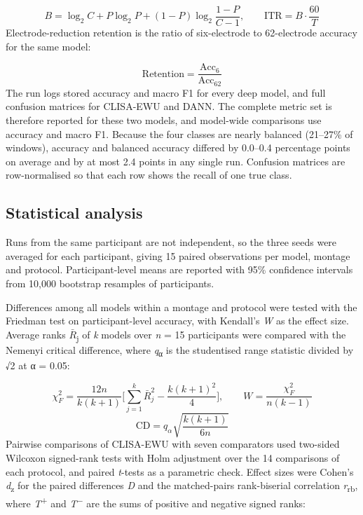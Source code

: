 \begin{equation}
  B=\log_2 C+P\log_2 P+(1-P)\log_2\frac{1-P}{C-1},\qquad \mathrm{ITR}=B\cdot\frac{60}{T}
  \label{eq:itr}
\end{equation}
Electrode-reduction retention is the ratio of six-electrode to 62-electrode accuracy for the same model:

\begin{equation}
  \mathrm{Retention}=\frac{\mathrm{Acc}_{6}}{\mathrm{Acc}_{62}}
  \label{eq:retention}
\end{equation}
The run logs stored accuracy and macro F1 for every deep model, and full confusion matrices for CLISA-EWU and DANN. The complete metric set is therefore reported for these two models, and model-wide comparisons use accuracy and macro F1. Because the four classes are nearly balanced (21–27\% of windows), accuracy and balanced accuracy differed by 0.0–0.4 percentage points on average and by at most 2.4 points in any single run. Confusion matrices are row-normalised so that each row shows the recall of one true class.


\subsection{Statistical analysis}
Runs from the same participant are not independent, so the three seeds were averaged for each participant, giving 15 paired observations per model, montage and protocol. Participant-level means are reported with 95\% confidence intervals from 10,000 bootstrap resamples of participants.

Differences among all models within a montage and protocol were tested with the Friedman test\cite{friedman} on participant-level accuracy, with Kendall’s \emph{W} as the effect size. Average ranks $\bar{R}$\textsubscript{j} of \emph{k} models over \emph{n} = 15 participants were compared with the Nemenyi critical difference\cite{demsar}, where \emph{q}\textsubscript{α} is the studentised range statistic divided by √2 at α = 0.05:

\begin{equation}
  \chi^{2}_{F}=\frac{12n}{k(k+1)}\Biggl[\sum_{j=1}^{k}\bar{R}_j^{2}-\frac{k(k+1)^{2}}{4}\Biggr],\qquad W=\frac{\chi^{2}_{F}}{n(k-1)}
  \label{eq:friedman}
\end{equation}
\begin{equation}
  \mathrm{CD}=q_{\alpha}\sqrt{\frac{k(k+1)}{6n}}
  \label{eq:cd}
\end{equation}
Pairwise comparisons of CLISA-EWU with seven comparators used two-sided Wilcoxon signed-rank tests\cite{wilcoxon} with Holm adjustment\cite{holm} over the 14 comparisons of each protocol, and paired \emph{t}-tests as a parametric check. Effect sizes were Cohen’s \emph{d}\textsubscript{z} for the paired differences \emph{D}\cite{lakens} and the matched-pairs rank-biserial correlation \emph{r}\textsubscript{rb}\cite{kerby}, where \emph{T}\textsuperscript{+} and \emph{T}\textsuperscript{−} are the sums of positive and negative signed ranks:

